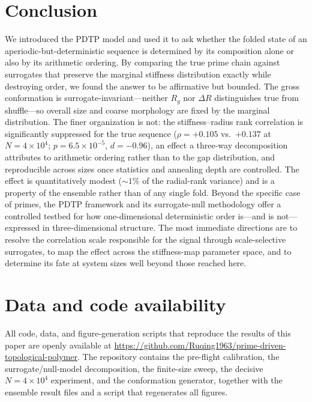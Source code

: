 \documentclass[11pt]{article}
\begin{document}
\section{Conclusion}
We introduced the PDTP model and used it to ask whether the folded state of an
aperiodic-but-deterministic sequence is determined by its composition alone or also by
its arithmetic ordering. By comparing the true prime chain against surrogates that
preserve the marginal stiffness distribution exactly while destroying order, we found
the answer to be affirmative but bounded. The gross conformation is
surrogate-invariant---neither $R_g$ nor $\Delta R$ distinguishes true from shuffle---so
overall size and coarse morphology are fixed by the marginal distribution. The finer
organization is not: the stiffness--radius rank correlation is significantly suppressed
for the true sequence ($\rho = +0.105$ vs.\ $+0.137$ at $N = 4\times10^4$;
$p = 6.5\times10^{-5}$, $d = -0.96$), an effect a three-way decomposition attributes to
arithmetic ordering rather than to the gap distribution, and reproducible across sizes
once statistics and annealing depth are controlled. The effect is quantitatively
modest ($\sim\!1\%$ of the radial-rank variance) and is a property of the ensemble
rather than of any single fold. Beyond the specific case of primes, the PDTP framework
and its surrogate-null methodology offer a controlled testbed for how one-dimensional
deterministic order is---and is not---expressed in three-dimensional structure. The
most immediate directions are to resolve the correlation scale responsible for the
signal through scale-selective surrogates, to map the effect across the stiffness-map
parameter space, and to determine its fate at system sizes well beyond those reached
here.

\section*{Data and code availability}
All code, data, and figure-generation scripts that reproduce the results of this paper
are openly available at
\url{https://github.com/Ruqing1963/prime-driven-topological-polymer}. The repository
contains the pre-flight calibration, the surrogate/null-model decomposition, the
finite-size sweep, the decisive $N = 4\times10^4$ experiment, and the conformation
generator, together with the ensemble result files and a script that regenerates all
figures.
\end{document}
